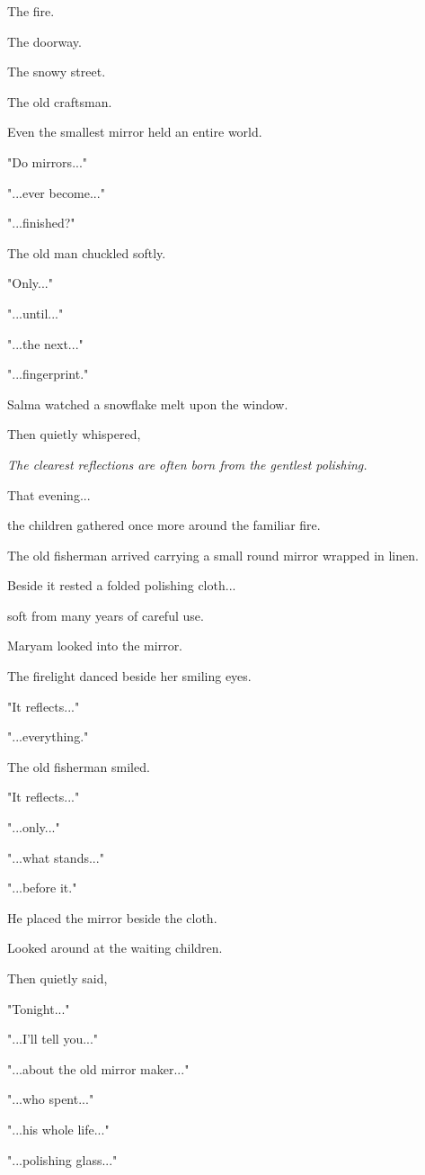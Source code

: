 \documentclass[12pt,openany]{book}
\begin{document}
The fire.

The doorway.

The snowy street.

The old craftsman.

Even the smallest mirror held an entire world.

"Do mirrors..."

"...ever become..."

"...finished?"

The old man chuckled softly.

"Only..."

"...until..."

"...the next..."

"...fingerprint."

Salma watched a snowflake melt upon the window.

Then quietly whispered,

\emph{The clearest reflections are often born from the gentlest polishing.}

That evening...

the children gathered once more around the familiar fire.

The old fisherman arrived carrying a small round mirror wrapped in linen.

Beside it rested a folded polishing cloth...

soft from many years of careful use.

Maryam looked into the mirror.

The firelight danced beside her smiling eyes.

"It reflects..."

"...everything."

The old fisherman smiled.

"It reflects..."

"...only..."

"...what stands..."

"...before it."

He placed the mirror beside the cloth.

Looked around at the waiting children.

Then quietly said,

"Tonight..."

"...I'll tell you..."

"...about the old mirror maker..."

"...who spent..."

"...his whole life..."

"...polishing glass..."
\end{document}
